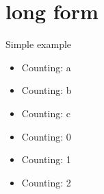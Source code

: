 \documentclass{article}
\begin{document}
\section{long form}
Simple example
\begin{itemize}
    \item Counting: a
    \item Counting: b
    \item Counting: c
\end{itemize}

\begin{itemize}
  \item Counting: 0
  \item Counting: 1
  \item Counting: 2
\end{itemize}
\end{document}
